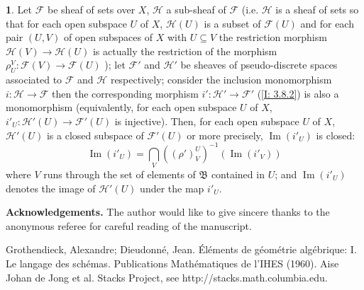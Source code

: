 \documentclass[12pt]{amsart}
\newcommand{\Ima}{\operatorname{Im}}
\theoremstyle{definition}
\newtheorem{bk}[proposition]{}
\begin{document}
\begin{bk}\label{I: 3.8.3} Let $\mathscr{F}$ be sheaf of sets over $X$,  $\mathscr{H}$ a sub-sheaf of $\mathscr{F}$ (i.e. $\mathscr{H}$ is a sheaf of sets so that for each open subspace $U$ of $X$, $\mathscr{H}(U)$ is a subset of $\mathscr{F}(U)$ and for each pair $(U,V)$ of open subspaces of $X$ with $U\subseteq V$ the restriction morphism $\mathscr{H}(V)\rightarrow\mathscr{H}(U)$ is actually the restriction of the morphism $\rho_{U}^{V}:\mathscr{F}(V)\rightarrow\mathscr{F}(U)$ ); let $\mathscr{F}'$ and $\mathscr{H}'$ be sheaves of pseudo-discrete spaces associated to $\mathscr{F}$ and $\mathscr{H}$ respectively; consider the inclusion monomorphism $i:\mathscr{H}\rightarrow\mathscr{F}$ then the corresponding morphism $i':\mathscr{H}'\rightarrow\mathscr{F}'$ (\ref{I: 3.8.2}) is also a monomorphism (equivalently, for each open subspace $U$ of $X$,  $i'_{U}:\mathscr{H}'(U)\rightarrow\mathscr{F}'(U)$ is injective). Then, for each open subspace $U$ of $X$, $\mathscr{H}'(U)$ is a closed subspace of $\mathscr{F}'(U)$ or more precisely, $\Ima(i'_{U})$ is closed:
$$\Ima(i'_{U})=\bigcap\limits_{V}((\rho')_{V}^{U})^{-1}(\Ima(i'_{V}))$$ where $V$ runs through the set of elements of $\mathfrak{B}$ contained in $U$; and $\Ima(i'_{U})$ denotes the image of $\mathscr{H}'(U)$ under the map $i'_{U}$.

\end{bk}

\textbf{Acknowledgements.} The author would like to give sincere thanks to the anonymous referee for careful reading of the manuscript.


\begin{thebibliography}{10}
Grothendieck, Alexandre; Dieudonn\'{e}, Jean. \'{E}l\'{e}ments de g\'{e}om\'{e}trie alg\'{e}brique: I. Le langage des sch\'{e}mas. Publications Math\'{e}matiques de l'IHES (1960).
Aise Johan de Jong et al. Stacks Project, see http://stacks.math.columbia.edu.
\end{thebibliography}
\end{document}

